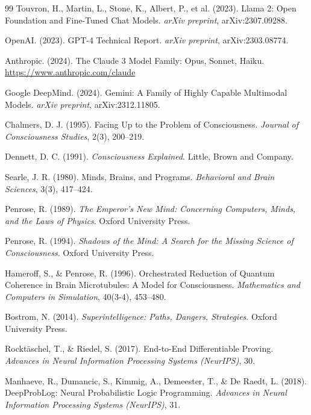 \begin{thebibliography}{99}
Touvron, H., Martin, L., Stone, K., Albert, P., et al. (2023). Llama 2: Open Foundation and Fine-Tuned Chat Models.
\textit{arXiv preprint}, arXiv:2307.09288.

OpenAI. (2023). GPT-4 Technical Report.
\textit{arXiv preprint}, arXiv:2303.08774.

Anthropic. (2024). The Claude 3 Model Family: Opus, Sonnet, Haiku.
\url{https://www.anthropic.com/claude}

Google DeepMind. (2024). Gemini: A Family of Highly Capable Multimodal Models.
\textit{arXiv preprint}, arXiv:2312.11805.

Chalmers, D. J. (1995). Facing Up to the Problem of Consciousness.
\textit{Journal of Consciousness Studies}, 2(3), 200--219.

Dennett, D. C. (1991). \textit{Consciousness Explained}. Little, Brown and Company.

Searle, J. R. (1980). Minds, Brains, and Programs.
\textit{Behavioral and Brain Sciences}, 3(3), 417--424.

Penrose, R. (1989). \textit{The Emperor's New Mind: Concerning Computers, Minds, and the Laws of Physics}. Oxford University Press.

Penrose, R. (1994). \textit{Shadows of the Mind: A Search for the Missing Science of Consciousness}. Oxford University Press.

Hameroff, S., \& Penrose, R. (1996). Orchestrated Reduction of Quantum Coherence in Brain Microtubules: A Model for Consciousness.
\textit{Mathematics and Computers in Simulation}, 40(3-4), 453--480.

Bostrom, N. (2014). \textit{Superintelligence: Paths, Dangers, Strategies}. Oxford University Press.

Rocktäschel, T., \& Riedel, S. (2017). End-to-End Differentiable Proving.
\textit{Advances in Neural Information Processing Systems (NeurIPS)}, 30.

Manhaeve, R., Dumancic, S., Kimmig, A., Demeester, T., \& De Raedt, L. (2018). DeepProbLog: Neural Probabilistic Logic Programming.
\textit{Advances in Neural Information Processing Systems (NeurIPS)}, 31.


\end{thebibliography}

